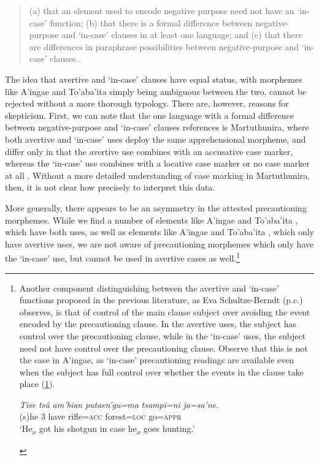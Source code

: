 \documentclass[output=paper,colorlinks,citecolor=brown]{langscibook}
\begin{document}
\begin{quote}
(a) that an element used to encode negative purpose need not have an `in-case' function; (b) that there is a formal difference between negative-purpose and `in-case' clauses in at least one language; and (c) that there are differences in paraphrase possibilities between negative-pur\-pose and `in-case' clauses \citep[302]{lichtenberk1995apprehensional}.
\end{quote}

The idea that avertive and `in-case' clauses have equal status, with morphemes like A'ingae  and To'aba'ita  simply being ambiguous between the two, cannot be rejected without a more thorough typology. There are, however, reasons for skepticism. First, we can note that the one language with a formal difference between negative-purpose and `in-case' clauses \citet{lichtenberk1995apprehensional} references is Martuthunira, where both avertive and `in-case' uses deploy the same apprehensional morpheme,  and differ only in that the avertive use combines with an accusative  case marker, whereas the `in-case' use combines with a locative  case marker or no case marker at all \citep{dench1988complex}. Without a more detailed understanding of case marking in Martuthunira, then, it is not clear how precisely to interpret this data.

More generally, there appears to be an asymmetry in the attested precautioning morphemes. While we find a number of elements like A'ingae \pagebreak and To'aba'ita , which have both uses, as well as elements like A'ingae  and To'aba'ita , which only have avertive uses, we are not aware of precautioning morphemes which only have the `in-case' use, but cannot be used in avertive cases as well.\footnote{{Another component distinguishing between the avertive and `in-case' functions proposed in the previous literature, as Eva Schultze-Berndt (p.c.) observes, is that of control of the main clause subject over avoiding the event encoded by the precautioning clause. In the avertive uses, the subject has control over the precautioning clause, while in the `in-case' uses, the subject need not have control over the precautioning clause. Observe that this is not the case in A'ingae, as `in-case' precautioning readings are available even when the subject has full control over whether the events in the  clause take place (\ref{gotoforest}).}
\begin{exe}
    \ex \label{gotoforest}
    \gll \textit{Tise} \textit{tsû} \textit{am'bian} \textit{putaen'gu=ma} {\ob}\textit{tsampi=ni} \textit{ja=sa'ne.}{\cb} \\
    (s)he \textsc{3} have rifle=\textsc{acc} forest=\textsc{loc} go=\textsc{appr} \\
    \glt `He\textsubscript{$x$} got his shotgun in case he\textsubscript{$x$} goes hunting.'
\end{exe}}
\end{document}
